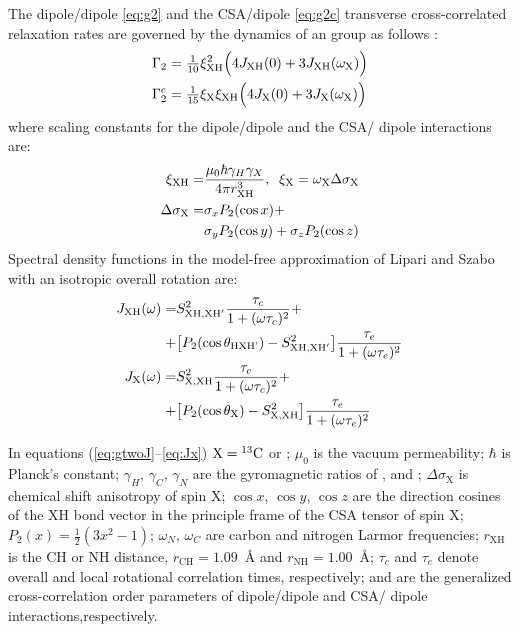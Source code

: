 \documentclass[twocolumn]{svjour3}           %
\begin{document}
The dipole\slash dipole \gtwo{} \eqref{eq:g2} and the 
CSA\slash dipole \gtwoCSA{} \eqref{eq:g2c} transverse 
cross-correlated relaxation rates are governed by the dynamics of an 
\XHtwo{} group as follows 
\cite{yang_probing_2011,kumar_cross-correlations_2000,banci_side_2001,zheng_measurement_2004,yang_study_1998}:
\begin{align}
  \label{eq:gtwoJ}
  \Gamma_2  & = 
    \tfrac{1}{10} \xi_\text{XH}^2
       \Bigl(4 J_{\text{XH}}(0) + 3 J_{\text{XH}}(\omega_\text{X} ) \Bigr )  \\
  \label{eq:gtwoCSAJ}
  \Gamma_2^c & = \tfrac{1}{15} \xi_\text{X} \xi_\text{XH}
    \Bigl(4 J_{\text{X}}(0) + 3 J_{\text{X}}(\omega_\text{X} ) \Bigr )
\end{align}
where scaling constants for the dipole\slash dipole and the CSA\slash 
dipole interactions are:
\begin{align}
  \xi_\text{XH} = &  
     \frac{\mu_0 \hbar \gamma_H \gamma_X }{4 \pi r_\text{XH}^3 }, 
  \thickspace\thickspace 
      \xi_\text{X} = \omega_\text{X} \Delta \sigma_\text{X} \\
  \Delta\sigma_\text{X} = & \sigma_x P_2(\cos x)+\nonumber \\
  & \sigma_y P_2(\cos y) + \sigma_z P_2(\cos z)
\end{align}
Spectral density functions in the model-free approximation of Lipari and Szabo 
\cite{lipari_model-free_1982} with an isotropic 
overall rotation are:
\begin{align}
  \label{eq:Jxh}
    J_{\text{XH}}(\omega)  = & S^2_{\text{XH,XH}'}\frac{ \tau_c}{1 + (\omega \tau_c)^2} 
     + \nonumber \\
     + & \bigl[ P_2(\cos\theta_\text{{HXH}'})-S^2_{\text{XH,XH}'}\bigr]
     \frac{\tau_e}{1+(\omega\tau_e)^2}\\
  \label{eq:Jx}
    J_{\text{X}}(\omega)  = & S^2_\text{X,XH} \frac{\tau_c}{1 + (\omega \tau_c)^2} 
    + \nonumber \\
    + & \bigl[ P_2(\cos\theta_\text{X})-S^2_\text{X,XH}\bigr]
     \frac{\tau_e}{1+(\omega\tau_e)^2}
\end{align}

In equations (\ref{eq:gtwoJ}--\ref{eq:Jx}) $\text{X} ={}^{13}\text{C}$ or \nlab;
$\mu_0$ is the vacuum permeability; 
$\hbar$ is Planck's constant; 
$\gamma_H$, $\gamma_C$, $\gamma_N$ are the gyromagnetic ratios of
  \hlab{}, \clab{} and \nlab;
$\Delta\sigma_\text{X}$ is chemical shift anisotropy of spin X;
$\cos x$, $\cos y$, $\cos z$ are the direction 
  cosines of the XH bond vector in the principle frame
  of the CSA tensor of spin X;
$P_2(x) = \tfrac{1}{2}(3x^2-1)$;
$\omega_N$, $\omega_C$ are carbon and nitrogen Larmor frequencies;
$r_\text{XH}$ is the {CH} or {NH} distance, 
$r_\text{CH} = 1.09$~\AA{} and $r_\text{NH} = 1.00$~\AA;
$\tau_c$ and $\tau_e$ denote overall and local rotational 
  correlation times, respectively; 
\StwoXHp{} and \StwoXXH{} are the generalized cross-correlation 
  order parameters of dipole\slash dipole and CSA\slash 
  dipole interactions,respectively.
\end{document}

